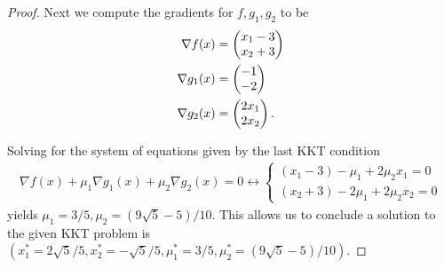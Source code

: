 \documentclass{exam}
\begin{document}
\begin{questions}
\begin{parts}
\begin{proof}
            Next we compute the gradients for $f, g_1, g_2$ to be
            \begin{align*}
                \nabla f(x) &= \left( \begin{matrix} x_1 - 3 \\ x_2 + 3\end{matrix} \right) \\
                \nabla g_1(x) &= \left( \begin{matrix}-1 \\ -2 \end{matrix} \right) \\
                \nabla g_2(x) &= \left( \begin{matrix}2x_1 \\ 2x_2 \end{matrix} \right).
            \end{align*}

            Solving for the system of equations given by the last KKT condition
            \begin{align*}
                \nabla f(x) + \mu_1\nabla g_1(x) + \mu_2\nabla g_2(x) = 0 \longleftrightarrow \begin{cases}
                    (x_1 - 3) - \mu_1 + 2\mu_2x_1 = 0 \\
                    (x_2 + 3) - 2\mu_1 + 2\mu_2x_2 = 0
                \end{cases}
            \end{align*}
            yields $\mu_1 = 3/5, \mu_2 = (9\sqrt{5} - 5)/10$. This allows us to conclude a solution to the given KKT problem is
            $(x_1^* = 2\sqrt{5}/5, x_2^* = -\sqrt{5}/5, \mu_1^* = 3 / 5, \mu_2^* = (9\sqrt{5} - 5)/10)$.
        \end{proof}
    \end{parts}
\end{questions}
\end{document}

